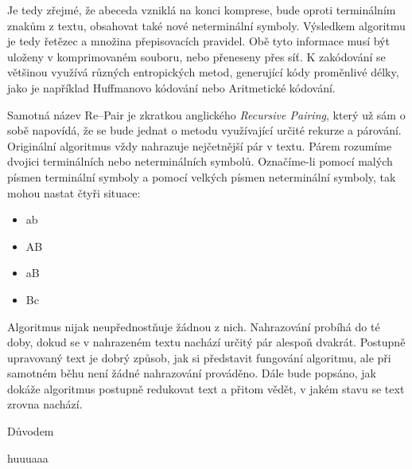 \documentclass[a4paper,12pt]{article}
\begin{document}
Je tedy zřejmé, že abeceda vzniklá na konci komprese, bude oproti terminálním znakům z textu, obsahovat také nové neterminální symboly. Výsledkem algoritmu je tedy řetězec a množina přepisovacích pravidel. Obě tyto informace musí být uloženy v komprimovaném souboru, nebo přeneseny přes síť. K zakódování se většinou využívá různých entropických metod, generující kódy proměnlivé délky, jako je například Huffmanovo kódování nebo Aritmetické kódování.

Samotná název Re--Pair je zkratkou anglického \emph{Recursive Pairing}, který už sám o sobě napovídá, že se bude jednat o metodu využívající určité rekurze a párování. Originální algoritmus vždy nahrazuje nejčetnější pár v textu. Párem rozumíme dvojici terminálních nebo neterminálních symbolů. Označíme-li pomocí malých písmen terminální symboly a pomocí velkých písmen neterminální symboly, tak mohou nastat čtyři situace:

\begin{itemize}
    \item ab
    \item AB
    \item aB
    \item Bc
\end{itemize}

\noindent Algoritmus nijak neupřednostňuje žádnou z nich. Nahrazování probíhá do té doby, dokud se v nahrazeném textu nachází určitý pár alespoň dvakrát. Postupně upravovaný text je dobrý způsob, jak si představit fungování algoritmu, ale při samotném běhu není žádné nahrazování prováděno. Dále bude popsáno, jak dokáže algoritmus postupně redukovat text a přitom vědět, v jakém stavu se text zrovna nachází.




Důvodem





huuuaaa



\end{document}
